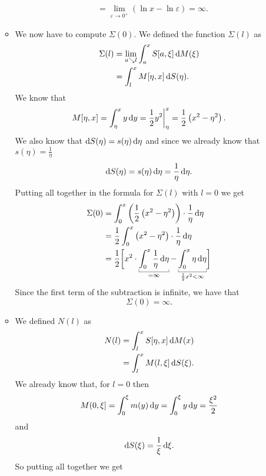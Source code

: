 \documentclass[12pt]{article}
\begin{document}
\begin{enumerate}
\begin{itemize}
\begin{align*}
				&=\lim_{\varepsilon\to0^{+}}\left(\ln x-\ln \varepsilon\right)=\infty.
			\end{align*}
			\item We now have to compute $\Sigma(0)$. We defined the function $\Sigma(l)$ as
			\begin{align*}
				\Sigma(l)&=\lim_{a\searrow l}\int_{a}^{x}S[a,\xi]\mathop{}\!\mathrm{d} M(\xi)\\
				&=\int_{l}^{x}M[\eta,x]\mathop{}\!\mathrm{d} S(\eta).
			\end{align*}
			We know that
			\begin{equation*}
				M[\eta,x]=\int_{\eta}^{x}y\mathop{}\!\mathrm{d} y=\frac{1}{2} y^{2}\bigg|^{x}_{\eta}=\frac{1}{2} \left(x^{2}-\eta^{2}\right).
			\end{equation*}
			We also know that $\mathop{}\!\mathrm{d} S(\eta)=s(\eta)\mathop{}\!\mathrm{d}\eta$ and since we already know that $s(\eta)=\frac{1}{\eta}$
			\begin{equation*}
				\mathop{}\!\mathrm{d} S(\eta)=s(\eta)\mathop{}\!\mathrm{d}\eta=\frac{1}{\eta}\mathop{}\!\mathrm{d}\eta.
			\end{equation*}
			Putting all together in the formula for $\Sigma(l)$ with $l=0$ we get
			\begin{align*}
				\Sigma(0)&=\int_{0}^{x}\left(\unmezz\left(x^{2}-\eta^{2}\right)\right)\cdot\frac{1}{\eta}\dif\eta\\
				&=\unmezz\int_{0}^{x}\left(x^{2}-\eta^{2}\right)\cdot\frac{1}{\eta}\dif\eta\\
				&=\unmezz\biggl[x^{2}\cdot\ubracketthin{\int^{x}_{0}\frac{1}{\eta}\dif\eta}_{=\infty}-\ubracketthin{\int_{0}^{x}\eta\dif\eta}_{\unmezz x^{2}<\infty}\biggr]
			\end{align*}
			Since the first term of the subtraction is infinite, we have that
			\begin{equation*}
				\Sigma(0)=\infty.
			\end{equation*}
			\item We defined $N(l)$ as
			\begin{align*}
				N(l)&=\int_{l}^{x}S[\eta,x]\mathop{}\!\mathrm{d} M(x)\\
				&=\int_{l}^{x}M(l,\xi]\mathop{}\!\mathrm{d} S(\xi).
			\end{align*}
			We already know that, for $l=0$ then
			\begin{equation*}
				M(0,\xi]=\int_{0}^{\xi}m(y)\mathop{}\!\mathrm{d} y=\int_{0}^{\xi}y\mathop{}\!\mathrm{d} y=\frac{\xi^{2}}{2}
			\end{equation*}
			and
			\begin{equation*}
				\mathop{}\!\mathrm{d} S(\xi)=\frac{1}{\xi}\mathop{}\!\mathrm{d}\xi.
			\end{equation*}
			So putting all together we get

\end{itemize}
\end{enumerate}
\end{document}
